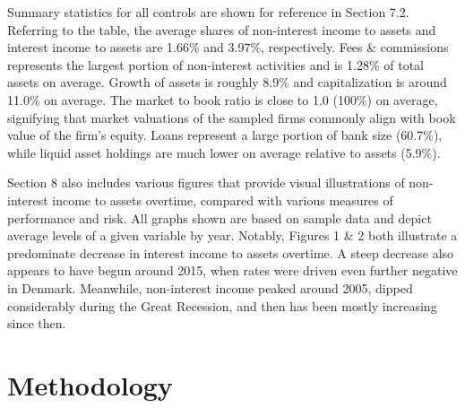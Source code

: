 \documentclass[10pt]{article} %
\begin{document}
Summary statistics for all controls are shown for reference in Section 7.2. Referring to the table, the average shares of non-interest income to assets and interest income to assets are 1.66\% and 3.97\%, respectively. Fees \& commissions represents the largest portion of non-interest activities and is 1.28\% of total assets on average. Growth of assets is roughly 8.9\% and capitalization is around 11.0\% on average. The market to book ratio is close to 1.0 (100\%) on average, signifying that market valuations of the sampled firms commonly align with book value of the firm's equity. Loans represent a large portion of bank size (60.7\%), while liquid asset holdings are much lower on average relative to assets (5.9\%). 

Section 8 also includes various figures that provide visual illustrations of non-interest income to assets overtime, compared with various measures of performance and risk. All graphs shown are based on sample data and depict average levels of a given variable by year. Notably, Figures 1 \& 2 both illustrate a predominate decrease in interest income to assets overtime. A steep decrease also appears to have begun around 2015, when rates were driven even further negative in Denmark. Meanwhile, non-interest income peaked around 2005, dipped considerably during the Great Recession, and then has been mostly increasing since then. 

\section{Methodology}
\end{document}
